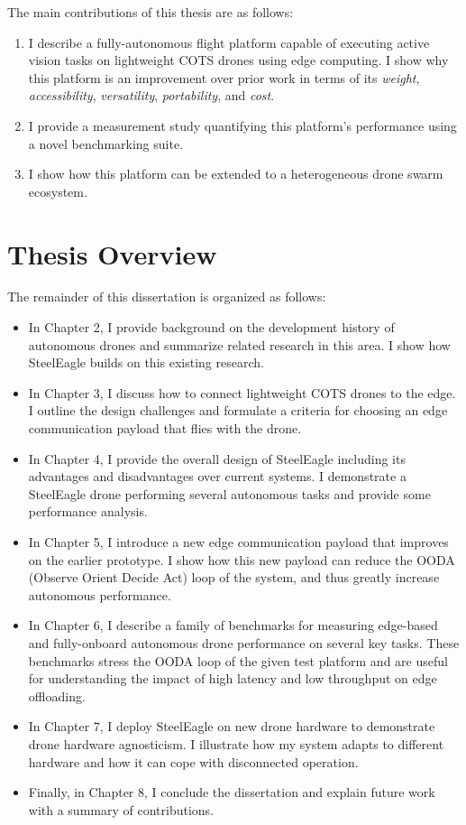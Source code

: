 \begin{flushleft}
The main contributions of this thesis are as follows:
\end{flushleft}
\begin{enumerate}
\item I describe a fully-autonomous flight platform capable of executing active vision tasks on lightweight COTS drones using edge computing. I show why this platform is an improvement over prior work in terms of its \textit{weight}, \textit{accessibility}, \textit{versatility}, \textit{portability}, and \textit{cost}.
\item I provide a measurement study quantifying this platform's performance using a novel benchmarking suite.
\item I show how this platform can be extended to a heterogeneous drone swarm ecosystem.  
\end{enumerate}

 

\section{Thesis Overview}
The remainder of this dissertation is organized as follows:
\begin{itemize}
    \item In Chapter 2, I provide background on the development history of autonomous drones and summarize related research in this area. I show how SteelEagle builds on this existing research.
    \item In Chapter 3, I discuss how to connect lightweight COTS drones to the edge. I outline the design challenges and formulate a criteria for choosing an edge communication payload that flies with the drone.
    \item In Chapter 4, I provide the overall design of SteelEagle including its advantages and disadvantages over current systems. I demonstrate a SteelEagle drone performing several autonomous tasks and provide some performance analysis.
    \item In Chapter 5, I introduce a new edge communication payload that improves on the earlier prototype. I show how this new payload can reduce the OODA (Observe Orient Decide Act) loop of the system, and thus greatly increase autonomous performance.
    \item In Chapter 6, I describe a family of benchmarks for measuring edge-based and fully-onboard autonomous drone performance on several key tasks. These benchmarks stress the OODA loop of the given test platform and are useful for understanding the impact of high latency and low throughput on edge offloading.
    \item In Chapter 7, I deploy SteelEagle on new drone hardware to demonstrate drone hardware agnosticism. I illustrate how my system adapts to different hardware and how it can cope with disconnected operation.
    \item Finally, in Chapter 8, I conclude the dissertation and explain future work with a summary of contributions.
\end{itemize}

